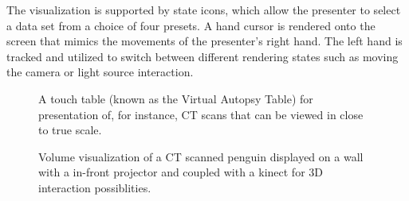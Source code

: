 \documentclass[review,journal]{vgtc}         %
\begin{document}
The visualization is supported by state icons, which allow the presenter to select a data set from a choice of four presets.
A hand cursor is rendered onto the screen that mimics the movements of the presenter's right hand.
The left hand is tracked and utilized to switch between different rendering states such as moving the camera or light source interaction.

\begin{figure}[t]
	\centering
	\caption{A touch table (known as the Virtual Autopsy Table) for presentation of, for instance, CT scans that can be viewed in close to true scale.}
	\label{img:exhibition_table}
\end{figure}

\begin{figure}[b]
	\centering
	\caption{Volume visualization of a CT scanned penguin displayed on a wall with a in-front projector and coupled with a kinect for 3D interaction possiblities.}
	\label{img:exhibition_kinect}
\end{figure}
\end{document}
